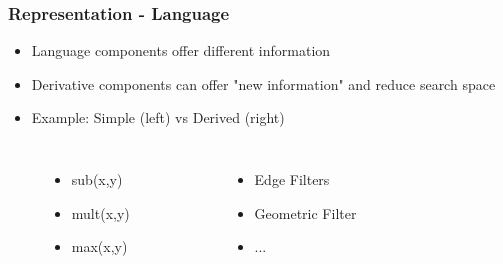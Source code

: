 \documentclass{beamer}
\begin{document}
\begin{frame}
\frametitle{Representation - Language}
	
	\begin{itemize}
		\item Language components offer different information
		\item Derivative components can offer "new information" and reduce search space
		\item Example: Simple (left) vs Derived (right)
	\end{itemize}
	
\begin{columns}[c]
\begin{figure}
\begin{itemize}
		\item sub(x,y)
		\item mult(x,y)
		\item max(x,y)
\end{itemize}
\end{figure}

\begin{figure}
\begin{itemize}
		\item Edge Filters
		\item Geometric Filter
		\item ...
		
\end{itemize}
\end{figure}
\end{columns}	

\end{frame}
\end{document}
